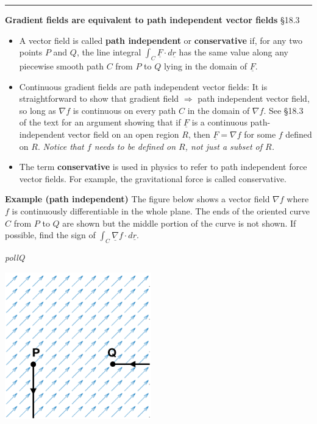 \documentclass[12pt,letterpaper,noanswers]{exam}
\newcommand{\mb}[1]{\underline{#1}}
\begin{document}
\vspace{0.2cm}
\hrule
\vspace{0.2cm}
\noindent\textbf{Gradient fields are equivalent to path independent vector fields} \S 18.3
\begin{tcolorbox}
\begin{itemize}
\itemsep0em
    \item A vector field is called \textbf{path independent} or \textbf{conservative} if, for any two points $P$ and $Q$, the line integral $\displaystyle\int_C \mb F\cdot d\mb r$ has the same value along any piecewise smooth path $C$ from $P$ to $Q$ lying in the domain of $\mb F$.  
    \item Continuous gradient fields are path independent vector fields: It is straightforward to show that gradient field $\Longrightarrow$ path independent vector field, so long as $\nabla f$ is continuous on every path $C$ in the domain of $\nabla f$.  See \S 18.3 of the text for an argument showing that if $\mb F$ is a continuous path-independent vector field on an open region $R$, then $\mb F = \nabla f$ for some $f$ defined on $R$.  \emph{Notice that $f$ needs to be defined on $R$, not just a subset of $R$.}
    \item The term \textbf{conservative} is used in physics to refer to path independent force vector fields.  For example, the gravitational force is called conservative.
\end{itemize}
\end{tcolorbox} 


\noindent\textbf{Example (path independent)} The figure below shows a vector field $\nabla f$ where $f$ is continuously differentiable in the whole plane.  The ends of the oriented curve $C$ from $P$ to $Q$ are shown but the middle portion of the curve is not shown.  If possible, find the sign of $\int_C \mb\nabla f\cdot d\mb r$.

\emph{pollQ}

\includegraphics[width=2.5in]{img/C26p1-18.png}
\end{document}
